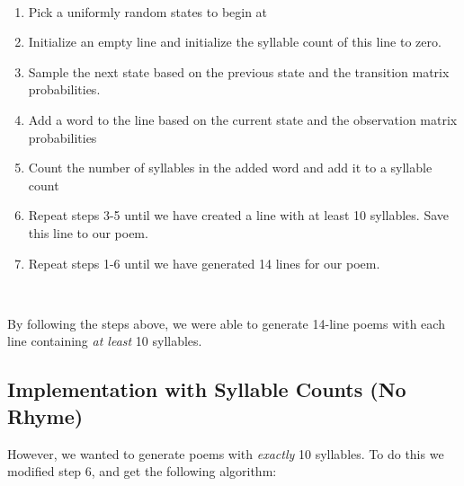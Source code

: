 ~

\begin{enumerate}

\item Pick a uniformly random states to begin at

\item Initialize an empty line and initialize the syllable count of this line to zero.

\item Sample the next state based on the previous state and the transition matrix probabilities.

\item Add a word to the line based on the current state and the observation matrix probabilities

\item Count the number of syllables in the added word and add it to a syllable count

\item Repeat steps 3-5 until we have created a line with at least 10 syllables. Save this line to our poem.

\item Repeat steps 1-6 until we have generated 14 lines for our poem.

\end{enumerate}
~

By following the steps above, we were able to generate 14-line poems with each line containing \textit{at least} 10 syllables. 

\subsection*{Implementation with Syllable Counts (No Rhyme)}

However, we wanted to generate poems with \textit{exactly} 10 syllables. To do this we modified step 6, and get the following algorithm:

